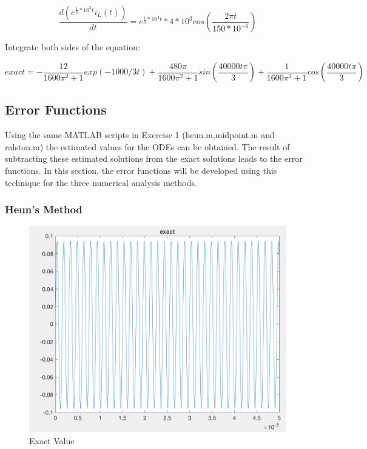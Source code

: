 \documentclass[11pt,a4paper]{article}
\begin{document}
\begin{equation}
\frac{d(e^{{\frac{1}{3}*10^3}t}i_L(t))}{dt}=e^{{\frac{1}{3}*10^3}t}*4*10^3cos(\frac{2{\pi}t}{150*{10^{-6}}})
\end{equation}

Integrate both sides of the equation:

\begin{equation}
exact=-\frac{12}{1600\pi^2+1}exp(-1000/3t)+\frac{480\pi}{1600\pi^2+1}sin(\frac{40000t\pi}{3})+\frac{1}{1600\pi^2+1}cos(\frac{40000t\pi}{3})
\end{equation}

\subsection{Error Functions}
Using the same MATLAB scripts in Exercise 1 (heun.m,midpoint.m and ralston.m) the estimated values for the ODEs can be obtained. The result of subtracting these estimated solutions from the exact solutions leads to the error functions. In this section, the error functions will be developed using this technique for the three numerical analysis methods.

\subsubsection{Heun's Method}

\begin{figure}[h]
    \centering
    \includegraphics[scale=0.5]{Ex2_Figs/heun_error_exact}
    \caption{Exact Value}
    \label{fig:Exact Value}
\end{figure}
\end{document}
